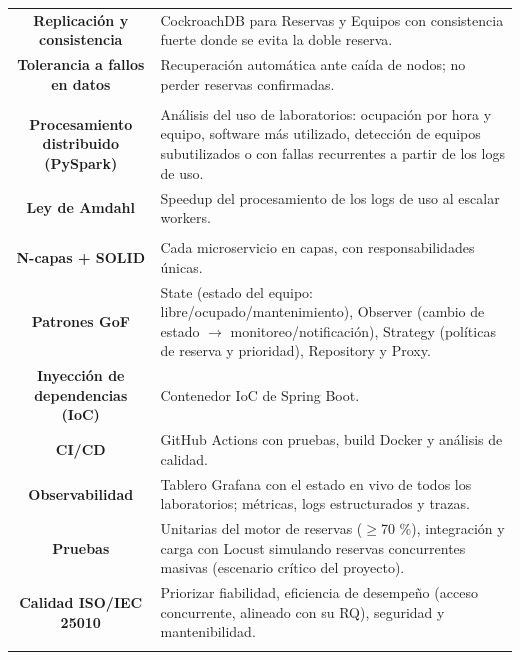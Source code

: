 \documentclass[11pt]{article}
\begin{document}
\begin{longtable}{C A}
\textbf{Replicación y consistencia} & CockroachDB para Reservas y Equipos con consistencia fuerte donde se evita la doble reserva.\\
\textbf{Tolerancia a fallos en datos} & Recuperación automática ante caída de nodos; no perder reservas confirmadas.\\
\addlinespace[1pt]
\\
\textbf{Procesamiento distribuido (PySpark)} & Análisis del uso de laboratorios: ocupación por hora y equipo, software más utilizado, detección de equipos subutilizados o con fallas recurrentes a partir de los logs de uso.\\
\textbf{Ley de Amdahl} & Speedup del procesamiento de los logs de uso al escalar workers.\\
\addlinespace[1pt]
\\
\textbf{N-capas + SOLID} & Cada microservicio en capas, con responsabilidades únicas.\\
\textbf{Patrones GoF} & State (estado del equipo: libre/ocupado/mantenimiento), Observer (cambio de estado $\rightarrow$ monitoreo/notificación), Strategy (políticas de reserva y prioridad), Repository y Proxy.\\
\textbf{Inyección de dependencias (IoC)} & Contenedor IoC de Spring Boot.\\
\textbf{CI/CD} & GitHub Actions con pruebas, build Docker y análisis de calidad.\\
\textbf{Observabilidad} & Tablero Grafana con el estado en vivo de todos los laboratorios; métricas, logs estructurados y trazas.\\
\textbf{Pruebas} & Unitarias del motor de reservas ($\geq$70 \%), integración y carga con Locust simulando reservas concurrentes masivas (escenario crítico del proyecto).\\
\textbf{Calidad ISO/IEC 25010} & Priorizar fiabilidad, eficiencia de desempeño (acceso concurrente, alineado con su RQ), seguridad y mantenibilidad.\\
\addlinespace[1pt]
\end{longtable}
\end{document}
